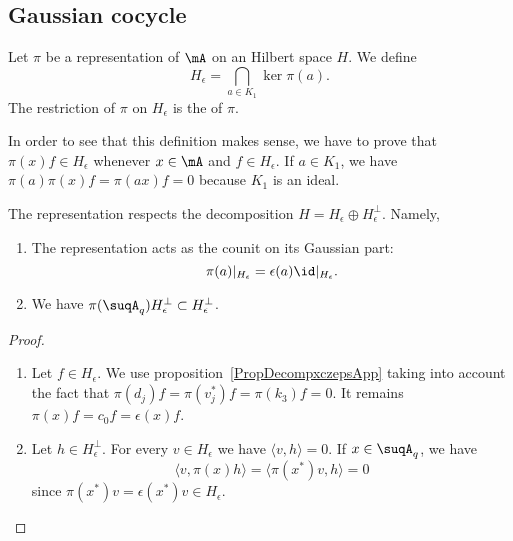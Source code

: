 \subsection{Gaussian cocycle}

\begin{definition}
	Let $\pi$ be a representation of $\mA$ on an Hilbert space $H$. We define
	\begin{equation}
		H_{\epsilon}=\bigcap_{a\in K_1}\ker\pi(a).
	\end{equation}
	The restriction of $\pi$ on $H_{\epsilon}$ is the  of $\pi$.
\end{definition}
In order to see that this definition makes sense, we have to prove that $\pi(x)f\in H_{\epsilon}$ whenever $x\in\mA$ and $f\in H_{\epsilon}$. If $a\in K_1$, we have $\pi(a)\pi(x)f=\pi(ax)f=0$ because $K_1$ is an ideal.

\begin{lemma}       \label{LempiepsHepsUni}
	The representation respects the decomposition \(H=H_{\epsilon}\oplus H_{\epsilon}^{\perp}\). Namely,
	\begin{enumerate}
		\item
		      The representation acts as the counit on its Gaussian part:
		      \begin{equation}
			      \pi(a)|_{H_{\epsilon}}=\epsilon(a)\id|_{H_{\epsilon}}.
		      \end{equation}
		\item
		      We have \(\pi(\suqA_q)H_{\epsilon}^{\perp}\subset H_{\epsilon}^{\perp}\).
	\end{enumerate}
\end{lemma}

\begin{proof}
	\begin{enumerate}
		\item
		      Let $f\in H_{\epsilon}$. We use proposition~\ref{PropDecompxczepsApp} taking into account the fact that $\pi(d_j)f=\pi(v_j^*)f=\pi(k_3)f=0$. It remains $\pi(x)f=c_0f=\epsilon(x)f$.
		\item
		      Let \(h\in H_{\epsilon}^{\perp}\). For every \(v\in H_{\epsilon}\) we have \(\langle v, h\rangle =0\). If \(x\in\suqA_q\), we have
		      \begin{equation}
			      \langle v, \pi(x)h\rangle =\langle \pi(x^*)v, h\rangle =0
		      \end{equation}
		      since \(\pi(x^*)v=\epsilon(x^*)v\in H_{\epsilon}\).
	\end{enumerate}
\end{proof}

